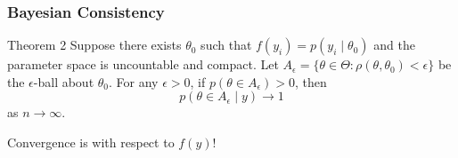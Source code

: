 \documentclass{beamer}
\begin{document}
\begin{frame}
\frametitle{Bayesian Consistency}

\begin{block}{Theorem 2}
Suppose there exists $\theta_0$ such that $f(y_i) = p(y_i \mid \theta_0)$ and the parameter space is uncountable and compact. Let $A_{\epsilon} = \{ \theta \in \Theta : \rho(\theta, \theta_0 ) < \epsilon \}$ be the $\epsilon$-ball about $\theta_0$. For any $\epsilon > 0$, if $p(\theta \in A_{\epsilon}) > 0$, then
$$
p(\theta \in A_{\epsilon} \mid y) \to 1 
$$
as $n \to \infty$.
\end{block}
Convergence is with respect to $f(y)$!


\end{frame}
\end{document}
